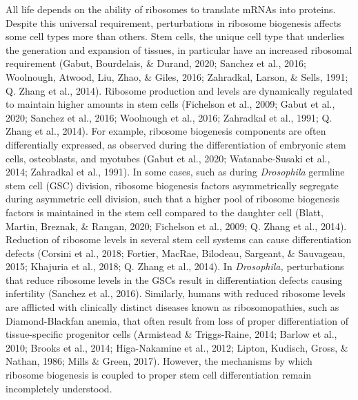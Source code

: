 \documentclass[12pt,oneside]{reedthesis}
\begin{document}
All life depends on the ability of ribosomes to translate mRNAs into
proteins. Despite this universal requirement, perturbations in ribosome
biogenesis affects some cell types more than others. Stem cells, the
unique cell type that underlies the generation and expansion of tissues,
in particular have an increased ribosomal requirement
(Gabut, Bourdelais, \& Durand, 2020; Sanchez et al., 2016; Woolnough, Atwood, Liu, Zhao, \& Giles, 2016; Zahradkal, Larson, \& Sells, 1991; Q. Zhang et al., 2014). Ribosome
production and levels are dynamically regulated to maintain higher
amounts in stem cells (Fichelson et al., 2009; Gabut et al., 2020; Sanchez et al., 2016; Woolnough et al., 2016; Zahradkal et al., 1991; Q. Zhang et al., 2014). For
example, ribosome biogenesis components are often differentially
expressed, as observed during the differentiation of embryonic stem
cells, osteoblasts, and myotubes
(Gabut et al., 2020; Watanabe-Susaki et al., 2014; Zahradkal et al., 1991). In some cases, such as
during \emph{Drosophila} germline stem cell (GSC) division, ribosome
biogenesis factors asymmetrically segregate during asymmetric cell
division, such that a higher pool of ribosome biogenesis factors is
maintained in the stem cell compared to the daughter cell
(Blatt, Martin, Breznak, \& Rangan, 2020; Fichelson et al., 2009; Q. Zhang et al., 2014). Reduction of ribosome levels in several stem cell
systems can cause differentiation defects
(Corsini et al., 2018; Fortier, MacRae, Bilodeau, Sargeant, \& Sauvageau, 2015; Khajuria et al., 2018; Q. Zhang et al., 2014). In \emph{Drosophila,} perturbations that reduce ribosome
levels in the GSCs result in differentiation defects causing infertility
(Sanchez et al., 2016). Similarly, humans with reduced ribosome levels are
afflicted with clinically distinct diseases known as ribosomopathies,
such as Diamond-Blackfan anemia, that often result from loss of proper
differentiation of tissue-specific progenitor cells (Armistead \& Triggs-Raine, 2014; Barlow et al., 2010; Brooks et al., 2014; Higa-Nakamine et al., 2012; Lipton, Kudisch, Gross, \& Nathan, 1986; Mills \& Green, 2017). However, the
mechanisms by which ribosome biogenesis is coupled to proper stem cell
differentiation remain incompletely understood.
\end{document}
